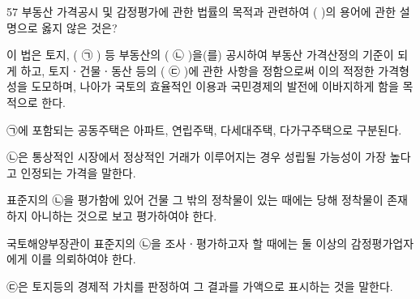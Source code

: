 \begin{question}{57}
부동산 가격공시 및 감정평가에 관한 법률의 목적과 관련하여 ( )의 용어에 관한 설명으로 옳지 않은 것은?
\begin{framedtext}
이 법은 토지, ( ㉠ ) 등 부동산의 ( ㉡ )을(를) 공시하여 부동산 가격산정의 기준이 되게 하고, 토지ㆍ건물ㆍ동산 등의 ( ㉢ )에 관한 사항을 정함으로써 이의 적정한 가격형성을 도모하며, 나아가 국토의 효율적인 이용과 국민경제의 발전에 이바지하게 함을 목적으로 한다. \par
\end{framedtext}
\begin{choices}
  \item ㉠에 포함되는 공동주택은 아파트, 연립주택, 다세대주택, 다가구주택으로 구분된다.
  \item ㉡은 통상적인 시장에서 정상적인 거래가 이루어지는 경우 성립될 가능성이 가장 높다고 인정되는 가격을 말한다.
  \item 표준지의 ㉡을 평가함에 있어 건물 그 밖의 정착물이 있는 때에는 당해 정착물이 존재하지 아니하는 것으로 보고 평가하여야 한다.
  \item 국토해양부장관이 표준지의 ㉡을 조사ㆍ평가하고자 할 때에는 둘 이상의 감정평가업자에게 이를 의뢰하여야 한다.
  \item ㉢은 토지등의 경제적 가치를 판정하여 그 결과를 가액으로 표시하는 것을 말한다.
\end{choices}
\end{question}
